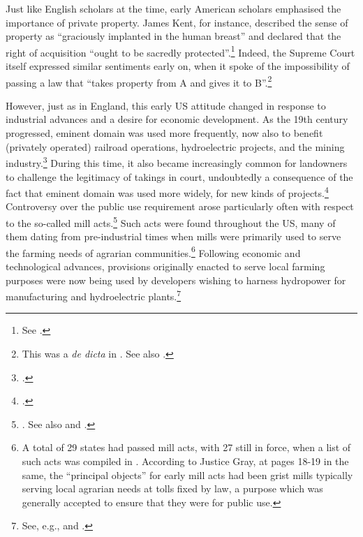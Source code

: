 Just like English scholars at the time, early American scholars emphasised the importance of private property. James Kent, for instance, described the sense of property as ``graciously implanted in the human breast'' and declared that the right of acquisition ``ought to be sacredly protected''.\footnote{See \cite[see][257]{kent27}.} Indeed, the Supreme Court itself expressed similar sentiments early on, when it spoke of the impossibility of passing a law that ``takes property from A and gives it to B''.\footnote{This was a {\it de dicta} in \cite[388]{calder98}. See also \cite[310]{vanhorne95}.}

However, just as in England, this early US attitude changed in response to industrial advances and a desire for economic development. As the 19th century progressed, eminent domain was used more frequently, now also to benefit (privately operated) railroad operations, hydroelectric projects, and the mining industry.\footcite[23-33]{meidinger80} During this time, it also became increasingly common for landowners to challenge the legitimacy of takings in court, undoubtedly a consequence of the fact that eminent domain was used more widely, for new kinds of projects.\footcite[24]{meidinger80} Controversy over the public use requirement arose particularly often with respect to the so-called mill acts.\footnote{\cite[24]{meidinger80}. See also \cite[306-313]{johnson11} and \cite[251-252]{horwitz73}.} Such acts were found throughout the US, many of them dating from pre-industrial times when mills were primarily used to serve the farming needs of agrarian communities.\footnote{A total of 29 states had passed mill acts, with 27 still in force, when a list of such acts was compiled in \cite[17]{head85}. According to Justice Gray, at pages 18-19 in the same, the ``principal objects'' for early mill acts had been grist mills typically serving local agrarian needs at tolls fixed by law, a purpose which was generally accepted to ensure that they were for public use.} Following economic and technological advances, provisions originally enacted to serve local farming purposes were now being used by developers wishing to harness hydropower for manufacturing and hydroelectric plants.\footnote{See, e.g., \cite[18-21]{head85} and \cite[449-452]{minn06}.}


